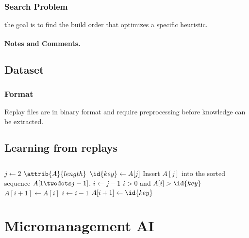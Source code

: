 \documentclass[sigconf]{acmart}
\begin{document}
\subsubsection{Search Problem}
the goal is to find the build order that optimizes a specific heuristic.
\paragraph{Notes and Comments.}
\subsection{Dataset}
\subsubsection{Format}
Replay files are in binary format and require preprocessing before knowledge can be extracted.
\subsection{Learning from replays}

\subsection{}

\begin{codebox}
\li \For $j \gets 2$ \To $\attrib{A}{length}$
\li \Do
$\id{key} \gets A[j]$
\li \Comment Insert $A[j]$ into the sorted sequence
$A[1 \twodots j-1]$.
\li $i \gets j-1$
\li \While $i > 0$ and $A[i] > \id{key}$
\li \Do
$A[i+1] \gets A[i]$
\li $i \gets i-1$
\End
\li $A[i+1] \gets \id{key}$
\End
\end{codebox}

\section{Micromanagement AI}
\subsection{}


 
\end{document}

